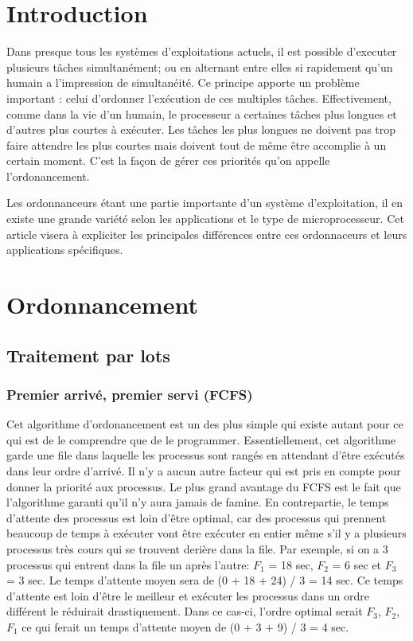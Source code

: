 \documentclass{article}
\begin{document}
\section{Introduction}
Dans presque tous les systèmes d'exploitations actuels, il est possible d'executer plusieurs tâches simultanément; ou en alternant entre elles si rapidement qu'un humain a l'impression de simultanéité. Ce principe apporte un problème important : celui d'ordonner l'exécution de ces multiples tâches. Effectivement, comme dans la vie d'un humain, le processeur a certaines tâches plus longues et d'autres plus courtes à exécuter. Les tâches les plus longues ne doivent pas trop faire attendre les plus courtes mais doivent tout de même être accomplie à un certain moment. C'est la façon de gérer ces priorités qu'on appelle l'ordonancement.

\newline
\newline

Les ordonnanceurs étant une partie importante d'un système d'exploitation, il en existe une grande variété selon les applications et le type de microprocesseur. Cet article visera à expliciter les principales différences entre ces ordonnaceurs et leurs applications spécifiques.


\section{Ordonnancement}

\subsection{Traitement par lots}
\subsubsection{Premier arrivé, premier servi (FCFS)}
Cet algorithme d'ordonancement est un des plus simple qui existe autant pour ce qui est de le comprendre que de le programmer. Essentiellement, cet algorithme garde une file dans laquelle les processus sont rangés en attendant d'être exécutés dans leur ordre d'arrivé. Il n'y a aucun autre facteur qui est pris en compte pour donner la priorité aux processus. Le plus grand avantage du FCFS est le fait que l'algorithme garanti qu'il n'y aura jamais de famine. En contrepartie, le temps d'attente des processus est loin d'être optimal, car des processus qui prennent beaucoup de temps à exécuter vont être exécuter en entier même s'il y a plusieurs processus très cours qui se trouvent derière dans la file. 
\newline
\newline
Par exemple, si on a 3 processus qui entrent dans la file un après l'autre:  $F_1$ = 18 sec, $F_2$ = 6 sec et $F_3$ = 3 sec. Le temps d'attente moyen sera de (0 + 18 + 24) / 3 = 14 sec. Ce temps d'attente est loin d'être le meilleur et exécuter les processus dans un ordre différent le réduirait drastiquement. Dans ce cas-ci, l'ordre optimal serait $F_3$, $F_2$, $F_1$ ce qui ferait un temps d'attente moyen de (0 + 3 + 9) / 3 = 4 sec.
\end{document}

